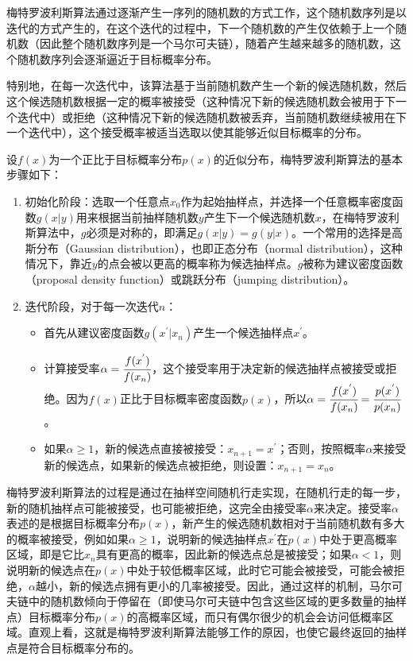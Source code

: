 梅特罗波利斯算法通过逐渐产生一序列的随机数的方式工作，这个随机数序列是以迭代的方式产生的，在这个迭代的过程中，下一个随机数的产生仅依赖于上一个随机数（因此整个随机数序列是一个马尔可夫链），随着产生越来越多的随机数，这个随机数序列会逐渐逼近于目标概率分布。

特别地，在每一次迭代中，该算法基于当前随机数产生一个新的候选随机数，然后这个候选随机数根据一定的概率被接受（这种情况下新的候选随机数会被用于下一个迭代中）或拒绝（这种情况下新的候选随机数被丢弃，当前随机数继续被用在下一个迭代中），这个接受概率被适当选取以使其能够近似目标概率的分布。

设$f(x)$为一个正比于目标概率分布$p(x)$的近似分布，梅特罗波利斯算法的基本步骤如下：

\begin{enumerate}
	\item 初始化阶段：选取一个任意点$x_0$作为起始抽样点，并选择一个任意概率密度函数$g(x|y)$用来根据当前抽样随机数$y$产生下一个候选随机数$x$，在梅特罗波利斯算法中，$g$必须是对称的，即满足$g(x|y)=g(y|x)$。一个常用的选择是高斯分布（Gaussian distribution），也即正态分布（normal distribution），这种情况下，靠近$y$的点会被以更高的概率称为候选抽样点。$g$被称为建议密度函数（proposal density function）或跳跃分布（jumping distribution）。
	\item 迭代阶段，对于每一次迭代$n$：
	\begin{itemize}
		\item 首先从建议密度函数$g(x^{'}|x_n)$产生一个候选抽样点$x^{'}$。
		\item 计算接受率$\alpha= \cfrac{f(x^{'})}{f(x_n)}$，这个接受率用于决定新的候选抽样点被接受或拒绝。因为$f(x)$正比于目标概率密度函数$p(x)$，所以$\alpha= \cfrac{f(x^{'})}{f(x_n)}= \cfrac{p(x^{'})}{p(x_n)}$。
		\item 如果$\alpha\geq 1$，新的候选点直接被接受：$x_{n+1}=x^{'}$；否则，按照概率$\alpha$来接受新的候选点，如果新的候选点被拒绝，则设置：$x_{n+1}=x_n$。
	\end{itemize}
\end{enumerate}

梅特罗波利斯算法的过程是通过在抽样空间随机行走实现，在随机行走的每一步，新的随机抽样点可能被接受，也可能被拒绝，这完全由接受率$\alpha$来决定。接受率$\alpha$表述的是根据目标概率分布$p(x)$，新产生的候选随机数相对于当前随机数有多大的概率被接受，例如如果$\alpha\geq 1$，说明新的候选抽样点$x^{'}$在$p(x)$中处于更高概率区域，即是它比$x_n$具有更高的概率，因此新的候选点总是被接受；如果$\alpha<1$，则说明新的候选点在$p(x)$中处于较低概率区域，此时它可能会被接受，可能会被拒绝，$\alpha$越小，新的候选点拥有更小的几率被接受。因此，通过这样的机制，马尔可夫链中的随机数倾向于停留在（即使马尔可夫链中包含这些区域的更多数量的抽样点）目标概率分布$p(x)$的高概率区域，而只有偶尔很少的机会会访问低概率区域。直观上看，这就是梅特罗波利斯算法能够工作的原因，也使它最终返回的抽样点是符合目标概率分布的。





